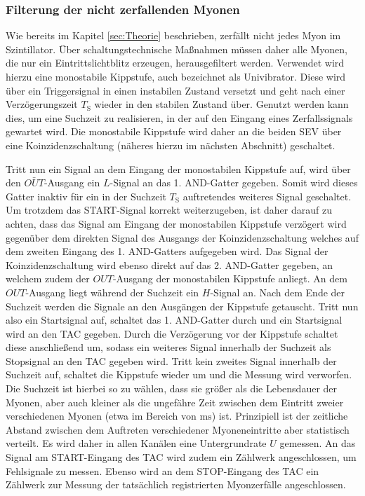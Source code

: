 \subsubsection{Filterung der nicht zerfallenden Myonen}
Wie bereits im Kapitel \ref{sec:Theorie} beschrieben, zerfällt nicht jedes Myon im Szintillator. Über schaltungstechnische Maßnahmen müssen daher alle Myonen, die nur ein Eintrittslichtblitz erzeugen, herausgefiltert werden.
Verwendet wird hierzu eine monostabile Kippstufe, auch bezeichnet als Univibrator. Diese wird über ein Triggersignal in einen instabilen Zustand versetzt und geht nach einer Verzögerungszeit $T_{\mathrm{S}}$ wieder in den stabilen Zustand über.
Genutzt werden kann dies, um eine Suchzeit zu realisieren, in der auf den Eingang eines Zerfallssignals gewartet wird.
Die monostabile Kippstufe wird daher an die beiden SEV über eine Koinzidenzschaltung (näheres hierzu im nächsten Abschnitt) geschaltet.

Tritt nun ein Signal an dem Eingang der monostabilen Kippstufe auf, wird über den $\bar{OUT}$-Ausgang ein $L$-Signal an das 1. AND-Gatter gegeben. Somit wird dieses Gatter inaktiv für ein in der Suchzeit $T_{\mathrm{S}}$ auftretendes weiteres Signal geschaltet. Um trotzdem das START-Signal korrekt weiterzugeben, ist daher darauf zu achten, dass das Signal am Eingang der monostabilen Kippstufe verzögert wird gegenüber dem direkten Signal des Ausgangs der Koinzidenzschaltung welches auf dem zweiten Eingang des 1. AND-Gatters aufgegeben wird.
Das Signal der Koinzidenzschaltung wird ebenso direkt auf das 2. AND-Gatter gegeben, an welchem zudem der $OUT$-Ausgang der monostabilen Kippstufe anliegt. An dem $OUT$-Ausgang liegt während der Suchzeit ein $H$-Signal an.
Nach dem Ende der Suchzeit werden die Signale an den Ausgängen der Kippstufe getauscht.
Tritt nun also ein Startsignal auf, schaltet das 1. AND-Gatter durch und ein Startsignal wird an den TAC gegeben. Durch die Verzögerung vor der Kippstufe schaltet diese anschließend um, sodass ein weiteres Signal innerhalb der Suchzeit als Stopsignal an den TAC gegeben wird.
Tritt kein zweites Signal innerhalb der Suchzeit auf, schaltet die Kippstufe wieder um und die Messung wird verworfen.
Die Suchzeit ist hierbei so zu wählen, dass sie größer als die Lebensdauer der Myonen, aber auch kleiner als die ungefähre Zeit zwischen dem Eintritt zweier verschiedenen Myonen (etwa im Bereich von $\si{\milli\second}$) ist.
Prinzipiell ist der zeitliche Abstand zwischen dem Auftreten verschiedener Myoneneintritte aber statistisch verteilt. Es wird daher in allen Kanälen eine Untergrundrate $U$ gemessen.
An das Signal am START-Eingang des TAC wird zudem ein Zählwerk angeschlossen, um Fehlsignale zu messen.
Ebenso wird an dem STOP-Eingang des TAC ein Zählwerk zur Messung der tatsächlich registrierten Myonzerfälle angeschlossen.
